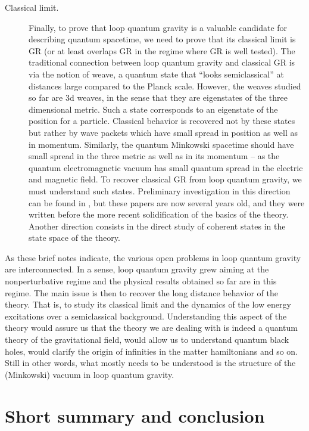 \documentclass[12pt]{article}
\begin{document}
\begin{description}
\item[Classical limit.]

Finally, to prove that loop quantum gravity is a valuable 
candidate for describing quantum spacetime, we need to prove that 
its classical limit is GR (or at least overlaps GR in the regime 
where GR is well tested).  The traditional connection between loop 
quantum gravity and classical GR is via the notion of weave, a 
quantum state that ``looks semiclassical'' at distances large 
compared to the Planck scale.  However, the weaves studied so far 
\cite{weave,GrotRovelli} are 3d weaves, in the sense that they are 
eigenstates of the three dimensional metric.  Such a state 
corresponds to an eigenstate of the position for a particle.  
Classical behavior is recovered not by these states but rather by 
wave packets which have small spread in position as well as in 
momentum.  Similarly, the quantum Minkowski spacetime should have 
small spread in the three metric as well as in its momentum -- as 
the quantum electromagnetic vacuum has small quantum spread in the 
electric and magnetic field.  To recover classical GR from loop 
quantum gravity, we must understand such states.  Preliminary 
investigation in this direction can be found in 
\cite{IwasakiRovelli2,IwasakiRovelli}, but these papers are now 
several years old, and they were written before the more recent 
solidification of the basics of the theory.  Another direction 
consists in the direct study of coherent states in the state space 
of the theory.

\end{description}


As these brief notes indicate, the various open problems in loop 
quantum gravity are interconnected.  In a sense, loop quantum 
gravity grew aiming at the nonperturbative regime and the physical 
results obtained so far are in this regime.  The main issue is 
then to recover the long distance behavior of the theory.  That 
is, to study its classical limit and the dynamics of the low 
energy excitations over a semiclassical background.  Understanding 
this aspect of the theory would assure us that the theory we are 
dealing with is indeed a quantum theory of the gravitational 
field, would allow us to understand quantum black holes, would 
clarify the origin of infinities in the matter hamiltonians and so 
on.  Still in other words, what mostly needs to be understood is 
the structure of the (Minkowski) vacuum in loop quantum gravity.

\section{Short summary and conclusion}\label{8}
\end{document}
